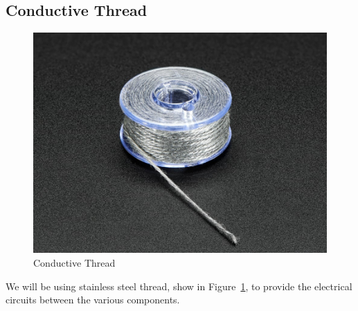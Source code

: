 \documentclass[letterpaper,twoside,12pt]{article}
\begin{document}
\subsection{Conductive Thread}
\begin{figure}[hbpt]\begin{centering}%
\includegraphics[width=5in]{conductivethread.jpg}
\caption{Conductive Thread}
\label{fig:conductivethread}
\end{centering}\end{figure}
We will be using stainless steel thread, show in 
Figure~\ref{fig:conductivethread}, to provide the electrical circuits between 
the various components. 
\clearpage
\end{document}
